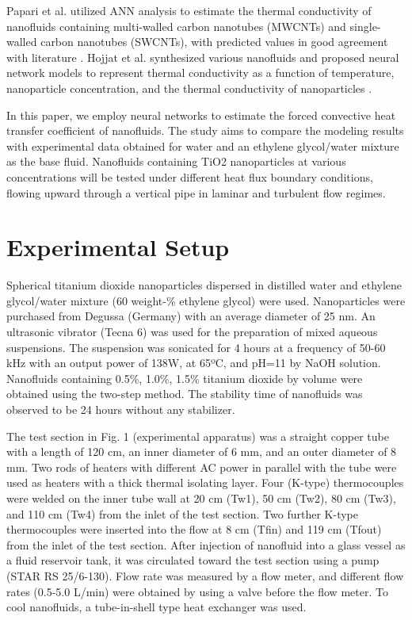 \documentclass{article}
\begin{document}
Papari et al. utilized ANN analysis to estimate the thermal conductivity of nanofluids containing multi-walled carbon nanotubes (MWCNTs) and single-walled carbon nanotubes (SWCNTs), with predicted values in good agreement with literature \cite{ref6}. Hojjat et al. synthesized various nanofluids and proposed neural network models to represent thermal conductivity as a function of temperature, nanoparticle concentration, and the thermal conductivity of nanoparticles \cite{ref7}.

In this paper, we employ neural networks to estimate the forced convective heat transfer coefficient of nanofluids. The study aims to compare the modeling results with experimental data obtained for water and an ethylene glycol/water mixture as the base fluid. Nanofluids containing TiO2 nanoparticles at various concentrations will be tested under different heat flux boundary conditions, flowing upward through a vertical pipe in laminar and turbulent flow regimes.


\section{Experimental Setup}
Spherical titanium dioxide nanoparticles dispersed in distilled water and ethylene glycol/water mixture (60 weight-\% ethylene glycol) were used. Nanoparticles were purchased from Degussa (Germany) with an average diameter of 25 nm. An ultrasonic vibrator (Tecna 6) was used for the preparation of mixed aqueous suspensions. The suspension was sonicated for 4 hours at a frequency of 50-60 kHz with an output power of 138W, at 65ºC, and pH=11 by NaOH solution. Nanofluids containing 0.5\%, 1.0\%, 1.5\% titanium dioxide by volume were obtained using the two-step method. The stability time of nanofluids was observed to be 24 hours without any stabilizer.

The test section in Fig. 1 (experimental apparatus) was a straight copper tube with a length of 120 cm, an inner diameter of 6 mm, and an outer diameter of 8 mm. Two rods of heaters with different AC power in parallel with the tube were used as heaters with a thick thermal isolating layer. Four (K-type) thermocouples were welded on the inner tube wall at 20 cm (Tw1), 50 cm (Tw2), 80 cm (Tw3), and 110 cm (Tw4) from the inlet of the test section. Two further K-type thermocouples were inserted into the flow at 8 cm (Tfin) and 119 cm (Tfout) from the inlet of the test section. After injection of nanofluid into a glass vessel as a fluid reservoir tank, it was circulated toward the test section using a pump (STAR RS 25/6-130). Flow rate was measured by a flow meter, and different flow rates (0.5-5.0 L/min) were obtained by using a valve before the flow meter. To cool nanofluids, a tube-in-shell type heat exchanger was used.
\end{document}
